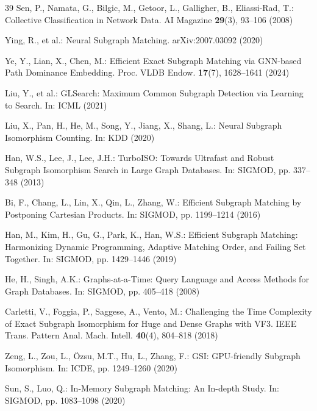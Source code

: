 \documentclass{article}
\begin{document}
{\begin{thebibliography}{39}
Sen, P., Namata, G., Bilgic, M., Getoor, L., Galligher, B., Eliassi-Rad, T.: Collective Classification in Network Data. AI Magazine \textbf{29}(3), 93--106 (2008)

Ying, R., et al.: Neural Subgraph Matching. arXiv:2007.03092 (2020)

Ye, Y., Lian, X., Chen, M.: Efficient Exact Subgraph Matching via GNN-based Path Dominance Embedding. Proc. VLDB Endow. \textbf{17}(7), 1628--1641 (2024)

Liu, Y., et al.: GLSearch: Maximum Common Subgraph Detection via Learning to Search. In: ICML (2021)

Liu, X., Pan, H., He, M., Song, Y., Jiang, X., Shang, L.: Neural Subgraph Isomorphism Counting. In: KDD (2020)

Han, W.S., Lee, J., Lee, J.H.: TurboISO: Towards Ultrafast and Robust Subgraph Isomorphism Search in Large Graph Databases. In: SIGMOD, pp. 337--348 (2013)

Bi, F., Chang, L., Lin, X., Qin, L., Zhang, W.: Efficient Subgraph Matching by Postponing Cartesian Products. In: SIGMOD, pp. 1199--1214 (2016)

Han, M., Kim, H., Gu, G., Park, K., Han, W.S.: Efficient Subgraph Matching: Harmonizing Dynamic Programming, Adaptive Matching Order, and Failing Set Together. In: SIGMOD, pp. 1429--1446 (2019)

He, H., Singh, A.K.: Graphs-at-a-Time: Query Language and Access Methods for Graph Databases. In: SIGMOD, pp. 405--418 (2008)

Carletti, V., Foggia, P., Saggese, A., Vento, M.: Challenging the Time Complexity of Exact Subgraph Isomorphism for Huge and Dense Graphs with VF3. IEEE Trans. Pattern Anal. Mach. Intell. \textbf{40}(4), 804--818 (2018)

Zeng, L., Zou, L., \"{O}zsu, M.T., Hu, L., Zhang, F.: GSI: GPU-friendly Subgraph Isomorphism. In: ICDE, pp. 1249--1260 (2020)

Sun, S., Luo, Q.: In-Memory Subgraph Matching: An In-depth Study. In: SIGMOD, pp. 1083--1098 (2020)


\end{thebibliography}}
\end{document}
